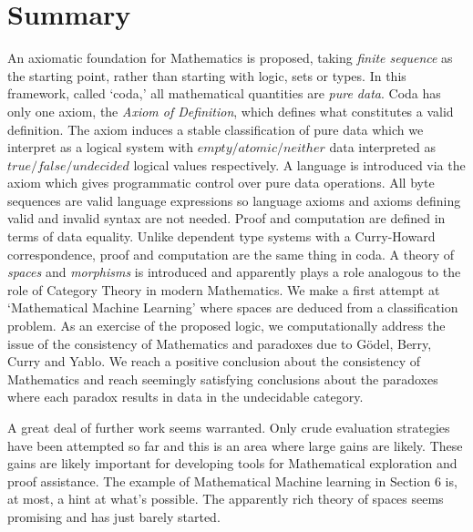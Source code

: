 \documentclass[11pt]{article}
\begin{document}
\section{Summary}

An axiomatic foundation for Mathematics is proposed, taking {\it finite sequence} as the starting point, rather than starting with logic, sets or types.  
In this framework, called `coda,' all mathematical quantities are {\it pure data}.  Coda has only one axiom, the {\it Axiom of Definition}, which defines 
what constitutes a valid definition.  The axiom induces a stable classification of pure data which we interpret as a logical system with 
$empty/atomic/neither$ data interpreted as $true/false/undecided$ logical values respectively.  A language is introduced via the axiom which 
gives programmatic control over pure data operations.  All byte sequences are valid language expressions so language axioms and 
axioms defining valid and invalid syntax are not needed.  Proof and computation are defined in terms of data equality.  Unlike 
dependent type systems with a Curry-Howard correspondence, proof and computation are the same thing in coda.  A theory of {\it spaces} and 
{\it morphisms} is introduced and apparently plays a role analogous to the role of Category Theory in modern  
Mathematics.  We make a first attempt at `Mathematical Machine Learning' where spaces are deduced from a classification problem. 
As an exercise of the proposed logic, we computationally address the issue of the consistency of Mathematics and paradoxes 
due to G\"odel, Berry, Curry and Yablo.  We reach a positive conclusion about the consistency of Mathematics and reach seemingly 
satisfying conclusions about the paradoxes where each paradox results in data in the undecidable category.  

    A great deal of further work seems warranted.  Only crude evaluation strategies have been attempted so far and this is an area 
where large gains are likely.  These gains are likely important for developing tools for Mathematical exploration and proof assistance.  
The example of Mathematical Machine learning in Section 6 is, at most, a hint at what's possible.  The apparently rich theory 
of spaces seems promising and has just barely started.   
\end{document}
